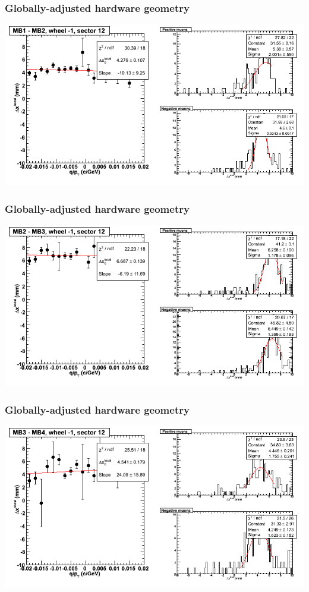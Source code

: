 \documentclass[compress]{beamer}
\begin{document}
\begin{frame}
\frametitle{Globally-adjusted hardware geometry}
\includegraphics[width=\linewidth]{NOV4_segdiffs_HW/dt13_resid_B_12_12.png}
\end{frame}

\begin{frame}
\frametitle{Globally-adjusted hardware geometry}
\includegraphics[width=\linewidth]{NOV4_segdiffs_HW/dt13_resid_B_12_23.png}
\end{frame}

\begin{frame}
\frametitle{Globally-adjusted hardware geometry}
\includegraphics[width=\linewidth]{NOV4_segdiffs_HW/dt13_resid_B_12_34.png}
\end{frame}
\end{document}
